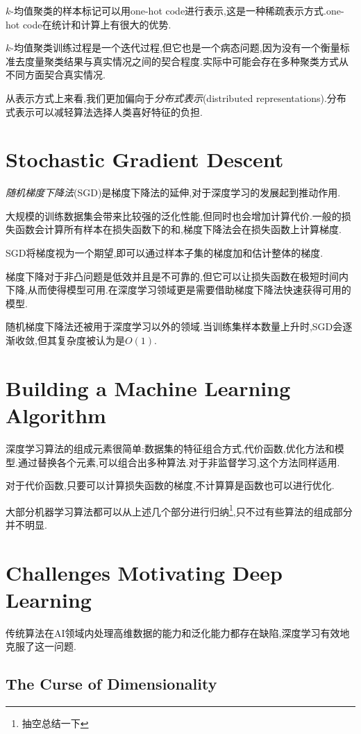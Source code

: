 $k$-均值聚类的样本标记可以用one-hot code进行表示,这是一种稀疏表示方式.one-hot code在统计和计算上有很大的优势.

$k$-均值聚类训练过程是一个迭代过程,但它也是一个病态问题,因为没有一个衡量标准去度量聚类结果与真实情况之间的契合程度.实际中可能会存在多种聚类方式从不同方面契合真实情况.

从表示方式上来看,我们更加偏向于\textit{分布式表示}(distributed representations).分布式表示可以减轻算法选择人类喜好特征的负担.

\section{Stochastic Gradient Descent}

\textit{随机梯度下降法}(SGD)是梯度下降法的延伸,对于深度学习的发展起到推动作用.

大规模的训练数据集会带来比较强的泛化性能,但同时也会增加计算代价.一般的损失函数会计算所有样本在损失函数下的和,梯度下降法会在损失函数上计算梯度.

SGD将梯度视为一个期望,即可以通过样本子集的梯度加和估计整体的梯度.

梯度下降对于非凸问题是低效并且是不可靠的,但它可以让损失函数在极短时间内下降,从而使得模型可用.在深度学习领域更是需要借助梯度下降法快速获得可用的模型.

随机梯度下降法还被用于深度学习以外的领域.当训练集样本数量上升时,SGD会逐渐收敛,但其复杂度被认为是$O(1)$.

\section{Building a Machine Learning Algorithm}

深度学习算法的组成元素很简单:数据集的特征组合方式,代价函数,优化方法和模型.通过替换各个元素,可以组合出多种算法.对于非监督学习,这个方法同样适用.

对于代价函数,只要可以计算损失函数的梯度,不计算算是函数也可以进行优化.

大部分机器学习算法都可以从上述几个部分进行归纳\footnote{抽空总结一下},只不过有些算法的组成部分并不明显.

\section{Challenges Motivating Deep Learning}

传统算法在AI领域内处理高维数据的能力和泛化能力都存在缺陷,深度学习有效地克服了这一问题.

\subsection{The Curse of Dimensionality}

